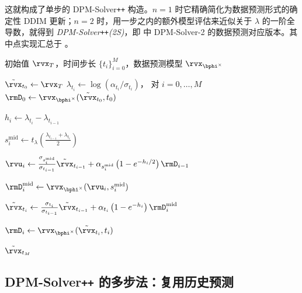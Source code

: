 这就构成了单步的 DPM-Solver\texttt{++} 构造。$n=1$ 时它精确简化为数据预测形式的确定性 DDIM 更新；$n=2$ 时，用一步之内的额外模型评估来近似关于 $\lambda$ 的一阶全导数，就得到
\emph{DPM-Solver\texttt{++}(2S)}，即  中
DPM-Solver-2 的数据预测对应版本。其中点实现汇总于
。
\begin{algorithm}[H]
    \centering
    \caption{DPM-Solver\texttt{++}(2S)：中点特例。}
    \label{alg:dpmpp-2s-mid}
    \begin{algorithmic}[1]
    \Require 初始值 $\rvx_T$，时间步长 $\{t_i\}_{i=0}^M$，数据预测模型 $\rvx_{\bphi^\times}$

    \State $\tilde\rvx_{t_0}\gets\rvx_T$
    \State $\lambda_{t_i}\gets\log(\alpha_{t_i}/\sigma_{t_i})$，
    对 $i=0,\ldots,M$
    \State
    $\rmD_0
    \gets
    \rvx_{\bphi^\times}(\tilde\rvx_{t_0},t_0)$

        \State
        $h_i
        \gets
        \lambda_{t_i}-\lambda_{t_{i-1}}$

        \State
        $s_i^{\mathrm{mid}}
        \gets
        t_\lambda
        \left(
        \tfrac{\lambda_{t_{i-1}}+\lambda_{t_i}}{2}
        \right)$

        \State
        $\rvu_i
        \gets
        \tfrac{\sigma_{s_i^{\mathrm{mid}}}}{\sigma_{t_{i-1}}}
        \tilde\rvx_{t_{i-1}}
        +
        \alpha_{s_i^{\mathrm{mid}}}
        \left(
        1-e^{-h_i/2}
        \right)
        \rmD_{i-1}$

        \State
        $\rmD_i^{\mathrm{mid}}
        \gets
        \rvx_{\bphi^\times}
        (\rvu_i,s_i^{\mathrm{mid}})$

        \State
        $\tilde\rvx_{t_i}
        \gets
        \tfrac{\sigma_{t_i}}{\sigma_{t_{i-1}}}
        \tilde\rvx_{t_{i-1}}
        +
        \alpha_{t_i}
        \left(
        1-e^{-h_i}
        \right)
        \rmD_i^{\mathrm{mid}}$

            \State
            $\rmD_i
            \gets
            \rvx_{\bphi^\times}
            (\tilde\rvx_{t_i},t_i)$
        \EndIf
    \EndFor

    \State \Return $\tilde\rvx_{t_M}$
    \end{algorithmic}
\end{algorithm}


\subsection{DPM-Solver\texttt{++} 的多步法：复用历史预测}
\label{subsec:dpm-solver++-multi}

